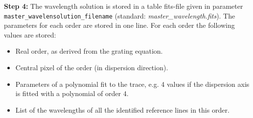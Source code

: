 \documentclass[10pt,a4paper]{article}
\begin{document}
\vspace{0.5em}\noindent \textbf{Step 4:} The wavelength solution is stored in a table fits-file given in parameter \verb|master_wavelensolution_filename| (standard: \textit{master\_wavelength.fits}). The parameters for each order are stored in one line. For each order the following values are stored:
\begin{itemize}
  \item Real order, as derived from the grating equation.
  \item Central pixel of the order (in dispersion direction).
  \item Parameters of a polynomial fit to the trace, e.g. 4 values if the dispersion axis is fitted with a polynomial of order 4.
  \item List of the wavelengths of all the identified reference lines in this order.
\end{itemize}
\end{document}
